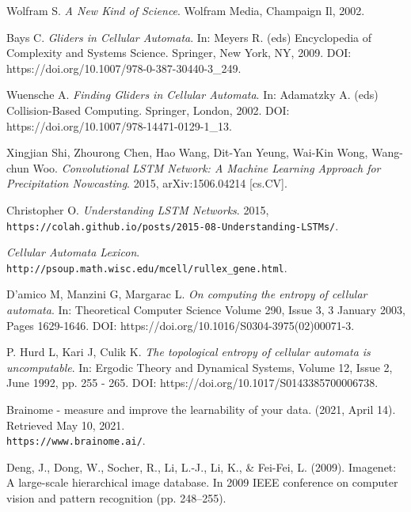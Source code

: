 \documentclass[12pt]{article}
\numberwithin{figure}{section} %
\begin{document}
\newpage
\begin{thebibliography}{9}
Wolfram S.
\textit{A New Kind of Science}. 
Wolfram Media, Champaign Il, 2002. 

Bays C.
\textit{Gliders in Cellular Automata}. 
In: Meyers R. (eds) Encyclopedia of Complexity and Systems Science. Springer, New York, NY, 2009.
DOI: https://doi.org/10.1007/978-0-387-30440-3\_249. 

Wuensche A.
\textit{Finding Gliders in Cellular Automata}. 
In: Adamatzky A. (eds) Collision-Based Computing. Springer, London, 2002. 
DOI: https://doi.org/10.1007/978-14471-0129-1\_13.

Xingjian Shi, Zhourong Chen, Hao Wang, Dit-Yan Yeung, Wai-Kin Wong, Wang-chun Woo. 
\textit{Convolutional LSTM Network: A Machine Learning Approach for Precipitation Nowcasting}. 
2015, arXiv:1506.04214 [cs.CV]. 

Christopher O.
\textit{Understanding LSTM Networks}. 
2015, \\\texttt{https://colah.github.io/posts/2015-08-Understanding-LSTMs/}. 

\textit{Cellular Automata Lexicon}.
\\\texttt{http://psoup.math.wisc.edu/mcell/rullex\_gene.html}. 

D'amico M, Manzini G, Margarac L.
\textit{On computing the entropy of cellular automata}.
In: Theoretical Computer Science Volume 290, Issue 3, 3 January 2003, Pages 1629-1646.
DOI: https://doi.org/10.1016/S0304-3975(02)00071-3. 

P. Hurd L, Kari J, Culik K. 
\textit{The topological entropy of cellular automata is uncomputable}.
In: Ergodic Theory and Dynamical Systems, Volume 12, Issue 2, June 1992, pp. 255 - 265. 
DOI: https://doi.org/10.1017/S0143385700006738. 

Brainome - measure and improve the learnability of your data. (2021, April 14). Retrieved May 10, 2021. 
\\\texttt{https://www.brainome.ai/}. 

Deng, J., Dong, W., Socher, R., Li, L.-J., Li, K., \& Fei-Fei, L. (2009). Imagenet: A large-scale hierarchical image database. In 2009 IEEE conference on computer vision and pattern recognition (pp. 248–255).


\end{thebibliography}
\end{document}
